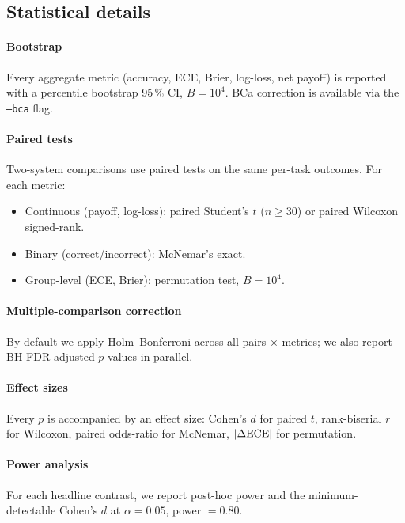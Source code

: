 \subsection{Statistical details}
\paragraph{Bootstrap}
Every aggregate metric (accuracy, ECE, Brier, log-loss, net payoff) is
reported with a percentile bootstrap 95\,\% CI, $B = 10^4$. BCa
correction is available via the \texttt{--bca} flag.

\paragraph{Paired tests}
Two-system comparisons use paired tests on the same per-task outcomes.
For each metric:
\begin{itemize}
  \item Continuous (payoff, log-loss): paired Student's $t$ ($n \ge 30$)
  or paired Wilcoxon signed-rank.
  \item Binary (correct/incorrect): McNemar's exact.
  \item Group-level (ECE, Brier): permutation test, $B = 10^4$.
\end{itemize}

\paragraph{Multiple-comparison correction}
By default we apply Holm--Bonferroni across all pairs $\times$
metrics; we also report BH-FDR-adjusted $p$-values in parallel.

\paragraph{Effect sizes}
Every $p$ is accompanied by an effect size: Cohen's $d$ for paired $t$,
rank-biserial $r$ for Wilcoxon, paired odds-ratio for McNemar,
$|\Delta\mathrm{ECE}|$ for permutation.

\paragraph{Power analysis}
For each headline contrast, we report post-hoc power and the minimum-
detectable Cohen's $d$ at $\alpha = 0.05$, power $= 0.80$.

